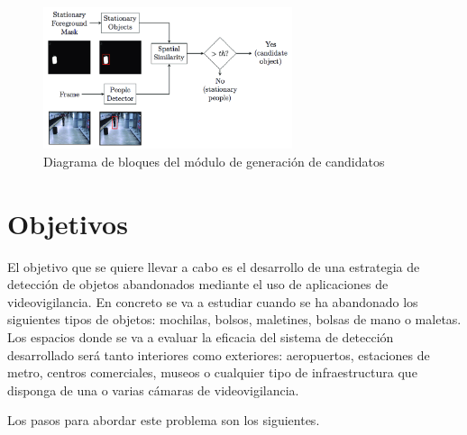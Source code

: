 \begin{figure}[ht]
\centering
\includegraphics[width=0.65\textwidth]{img/chapters/introduccion/Block-diagram-Stationary-detection.png}
\caption{\label{fig:diagram-stationary-detection}Diagrama de bloques del módulo de generación de candidatos}
\end{figure}

\section{Objetivos}
\label{sec:objetivos}

El objetivo que se quiere llevar a cabo es el desarrollo de una estrategia de detección de objetos abandonados mediante el uso de aplicaciones de videovigilancia. En concreto se va a estudiar cuando se ha abandonado los siguientes tipos de objetos: mochilas, bolsos, maletines, bolsas de mano o maletas. Los espacios donde se va a evaluar la eficacia del sistema de detección desarrollado será tanto interiores como exteriores: aeropuertos, estaciones de metro, centros comerciales, museos o cualquier tipo de infraestructura que disponga de una o varias cámaras de videovigilancia. 

Los pasos para abordar este problema son los siguientes.

